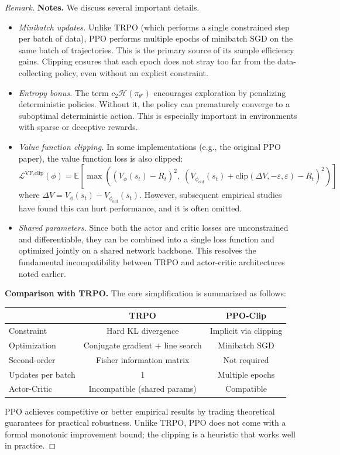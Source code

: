 \documentclass[11pt, letterpaper]{article}
\newenvironment{remark}
    {\renewcommand\qedsymbol{\(\blacksquare\)}\begin{proof}[Remark]}
    {\end{proof}}
\begin{document}
\begin{remark}
    \textbf{Notes.} We discuss several important details. 
    \begin{itemize}
        \item \textit{Minibatch updates.} Unlike TRPO (which performs a single constrained step per batch of data), PPO performs multiple epochs of minibatch SGD on the same batch of trajectories. This is the primary source of its sample efficiency gains. Clipping ensures that each epoch does not stray too far from the data-collecting policy, even without an explicit constraint. 
        \item \textit{Entropy bonus.} The term \(c_2 \mathcal{H}(\pi_{\theta'})\) encourages exploration by penalizing deterministic policies. Without it, the policy can prematurely converge to a suboptimal deterministic action. This is especially important in environments with sparse or deceptive rewards.
        \item \textit{Value function clipping.} In some implementations (e.g., the original PPO paper), the value function loss is also clipped: 
        \[
            \mathcal{L}^{\text{VF,clip}}(\phi) = \mathbb{E}\left[\max\left((V_\phi(s_t) - R_t)^2,\; (V_{\phi_{\text{old}}}(s_t) + \text{clip}(\Delta V, -\varepsilon, \varepsilon) - R_t)^2\right)\right]
        \]
        where \(\Delta V = V_\phi(s_t) - V_{\phi_{\text{old}}}(s_t)\). However, subsequent empirical studies have found this can hurt performance, and it is often omitted. 
        \item \textit{Shared parameters.} Since both the actor and critic losses are unconstrained and differentiable, they can be combined into a single loss function and optimized jointly on a shared network backbone. This resolves the fundamental incompatibility between TRPO and actor-critic architectures noted earlier. 
    \end{itemize}

    \textbf{Comparison with TRPO.} The core simplification is summarized as follows: 
    \begin{center}
    \begin{tabular}{lcc}
        & \textbf{TRPO} & \textbf{PPO-Clip} \\
        \hline
        Constraint & Hard KL divergence & Implicit via clipping \\
        Optimization & Conjugate gradient + line search & Minibatch SGD \\
        Second-order & Fisher information matrix & Not required \\
        Updates per batch & 1 & Multiple epochs \\
        Actor-Critic & Incompatible (shared params) & Compatible \\
    \end{tabular}
    \end{center}
    PPO achieves competitive or better empirical results by trading theoretical guarantees for practical robustness. Unlike TRPO, PPO does not come with a formal monotonic improvement bound; the clipping is a heuristic that works well in practice. 
\end{remark}
\end{document}
